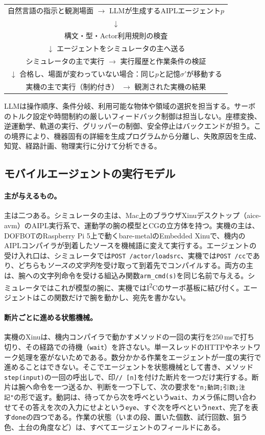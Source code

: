 \documentclass[10pt,letterpaper]{article}
\begin{document}
\begin{center}
\small\begin{tabular}{c}
自然言語の指示と観測場面 $\longrightarrow$ LLMが生成するAIPLエージェント$p$\\
$\downarrow$\\
構文・型・Actor利用規則の検査\\
$\downarrow$ エージェントをシミュレータの主へ送る\\
シミュレータの主で実行 $\longrightarrow$ 実行履歴と作業条件の検証\\
$\downarrow$ 合格し、場面が変わっていない場合：同じ$p$と記憶$\sigma'$が移動する\\
実機の主で実行（制約付き） $\longrightarrow$ 観測された実機の結果
\end{tabular}
\end{center}

LLMは操作順序、条件分岐、利用可能な物体や領域の選択を担当する。サーボのトルク設定や時間制約の厳しいフィードバック制御は担当しない。座標変換、逆運動学、軌道の実行、グリッパーの制御、安全停止はバックエンドが担う。この境界により、機器固有の詳細を生成プログラムから分離し、失敗原因を生成、知覚、経路計画、物理実行に分けて分析できる。

\subsection{モバイルエージェントの実行モデル}\label{sec:agentmodel}
\paragraph{主が与えるもの。}主は二つある。シミュレータの主は、Mac上のブラウザXinuデスクトップ（aice-avm）のAIPL実行系で、運動学の腕の模型とCGの立方体を持つ。実機の主は、DOFBOTのRaspberry Pi 5上で動くbare-metalのEmbedded Xinuで、機内のAIPLコンパイラが到着したソースを機械語に変えて実行する。エージェントの受け入れ口は、シミュレータでは\texttt{POST /actor/loadsrc}、実機では\texttt{POST /cc}であり、どちらも\emph{ソースの文字列}を受け取って到着先でコンパイルする。両方の主は、腕への文字列命令を受ける組込み関数\texttt{arm\_cmd(s)}を同じ名前で与える。シミュレータではこれが模型の腕に、実機ではI\textsuperscript{2}Cのサーボ基板に結び付く。エージェントはこの関数だけで腕を動かし、宛先を書かない。

\paragraph{断片ごとに進める状態機械。}実機のXinuは、機内コンパイラで動かすメソッドの一回の実行を250\,msで打ち切り、その経路での待機（\texttt{wait}）を許さない。単一スレッドのHTTPやネットワーク処理を塞がないためである。数分かかる作業をエージェントが一度の実行で進めることはできない。そこでエージェントを状態機械として書き、メソッド\texttt{step(input)}の一回の呼出しで、印\texttt{// [n]}を付けた断片を一つだけ実行する。断片は腕へ命令を一つ送るか、判断を一つ下して、次の要求を\texttt{"n;動詞;引数;注記"}の形で返す。動詞は、待ってから次を呼べという\texttt{wait}、カメラ係に問い合わせてその答えを次の入力にせよという\texttt{eye}、すぐ次を呼べという\texttt{next}、完了を表す\texttt{done}の四つである。作業の状態（いまの段、置いた個数、試行回数、狙う色、土台の角度など）は、すべてエージェントのフィールドにある。
\end{document}
